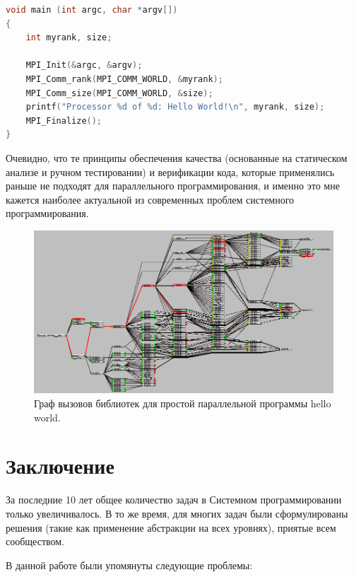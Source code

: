 \documentclass[a4paper, 12pt]{article} %
\begin{document}
\begin{lstlisting}[language=C++, caption={Пример простой многопоточной программы hello world}]
void main (int argc, char *argv[])
{
    int myrank, size;

    MPI_Init(&argc, &argv);
    MPI_Comm_rank(MPI_COMM_WORLD, &myrank);
    MPI_Comm_size(MPI_COMM_WORLD, &size);
    printf("Processor %d of %d: Hello World!\n", myrank, size);
    MPI_Finalize();
}
\end{lstlisting}

Очевидно, что те принципы обеспечения качества (основанные на статическом анализе и ручном тестировании) и верификации кода, которые применялись раньше не подходят для параллельного программирования, и именно это мне кажется наиболее актуальной из современных проблем системного программирования.

\begin{figure}[h!]
\centering
\includegraphics[scale=0.45]{res/pic006}
\caption{Граф вызовов библиотек для простой параллельной программы hello world.}
\end{figure}


\section*{Заключение}

За последние 10 лет общее количество задач в Системном программировании только увеличивалось. В то же время, для многих задач были сформулированы решения (такие как применение абстракции на всех уровнях), приятые всем сообществом.

В данной работе были упомянуты следующие проблемы:
\end{document}
